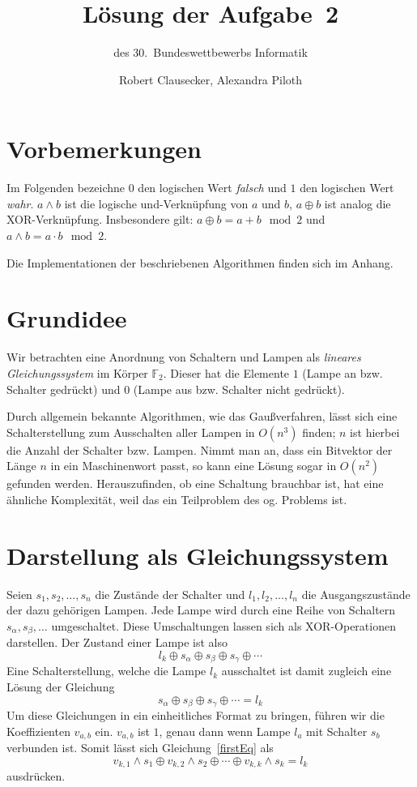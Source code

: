 \documentclass{scrartcl}
\title{Lösung der Aufgabe~2}
\subtitle{des 30.~Bundeswettbewerbs Informatik}
\author{Robert Clausecker, Alexandra Piloth}
\newcommand{\ftwo}{\ensuremath{\mathbb F_2}}
\newcommand{\bigO}{O}
\newcommand{\xor}{\oplus}
\begin{document}
\maketitle

\section*{Vorbemerkungen}
Im Folgenden bezeichne $0$ den logischen Wert \emph{falsch} und $1$ den
logischen Wert \emph{wahr}. $a\land b$ ist die logische und-Verknüpfung von $a$
und $b$, $a\xor b$ ist analog die XOR-Verknüpfung. Insbesondere gilt:
$a\xor b=a+b\mod 2$ und $a\land b=a\cdot b\mod 2$.

Die Implementationen der beschriebenen Algorithmen finden sich im Anhang.

\section{Grundidee}
Wir betrachten eine Anordnung von Schaltern und Lampen als \emph{lineares
Gleichungssystem} im Körper \ftwo.  Dieser hat die Elemente $1$ (Lampe an bzw.
Schalter gedrückt) und $0$ (Lampe aus bzw. Schalter nicht gedrückt).

Durch allgemein bekannte Algorithmen, wie das Gaußverfahren, lässt sich eine
Schalterstellung zum Ausschalten aller Lampen in $\bigO(n^3)$ finden; $n$ ist
hierbei die Anzahl der Schalter bzw. Lampen. Nimmt man an, dass ein Bitvektor
der Länge $n$ in ein Maschinenwort passt, so kann eine Lösung sogar in $\bigO(
n^2)$ gefunden werden. Herauszufinden, ob eine Schaltung brauchbar ist, hat eine
ähnliche Komplexität, weil das ein Teilproblem des og. Problems ist.

\section{Darstellung als Gleichungssystem}
Seien $s_1, s_2,\dots, s_n$ die Zustände der Schalter und $l_1, l_2,\dots,l_n$
die Ausgangszustände der dazu gehörigen Lampen. Jede Lampe wird durch eine Reihe
von Schaltern $s_\alpha, s_\beta,\dots$ umgeschaltet. Diese Umschaltungen lassen
sich als XOR-Operationen darstellen. Der Zustand einer Lampe ist also
\begin{equation}
l_k \xor s_\alpha \xor s_\beta \xor s_\gamma \xor \cdots
\end{equation}
Eine Schalterstellung, welche die Lampe $l_k$ ausschaltet ist damit zugleich
eine Lösung der Gleichung
\begin{equation}
s_\alpha \xor s_\beta \xor s_\gamma \xor \cdots = l_k\label{firstEq}
\end{equation}
Um diese Gleichungen in ein einheitliches Format zu bringen, führen
wir die Koeffizienten $v_{a,b}$ ein. $v_{a,b}$ ist $1$, genau dann wenn Lampe
$l_a$ mit Schalter $s_b$ verbunden ist. Somit lässt sich Gleichung~\ref{firstEq}
als
\begin{equation}
v_{k,1}\land s_1\xor v_{k,2}\land s_2\xor\cdots\xor v_{k,k}\land s_k=l_k
\end{equation}
ausdrücken.
\end{document}
